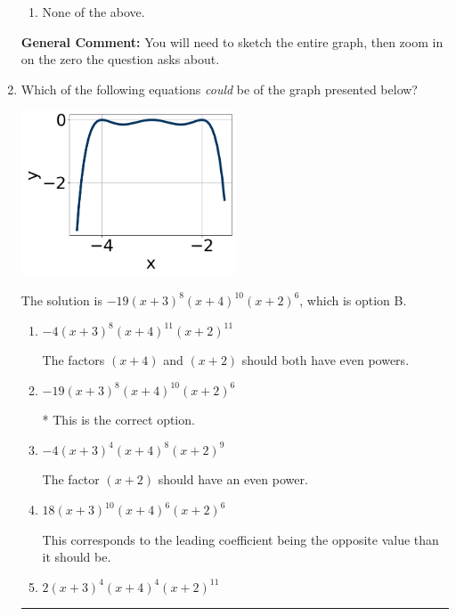 \documentclass{extbook}[14pt]
\newcommand{\litem}[1]{\item #1

\rule{\textwidth}{0.4pt}}
\begin{document}
\begin{enumerate}
{\begin{enumerate}[label=\Alph*.]
\item None of the above.\end{enumerate}
\textbf{General Comment:} You will need to sketch the entire graph, then zoom in on the zero the question asks about.
}
\litem{
Which of the following equations \textit{could} be of the graph presented below?

\begin{center}
    \includegraphics[width=0.5\textwidth]{../Figures/polyGraphToFunctionCopyC.png}
\end{center}


The solution is \( -19(x + 3)^{8} (x + 4)^{10} (x + 2)^{6} \), which is option B.\begin{enumerate}[label=\Alph*.]
\item \( -4(x + 3)^{8} (x + 4)^{11} (x + 2)^{11} \)

The factors $(x + 4)$ and $(x + 2)$ should both have even powers.
\item \( -19(x + 3)^{8} (x + 4)^{10} (x + 2)^{6} \)

* This is the correct option.
\item \( -4(x + 3)^{4} (x + 4)^{8} (x + 2)^{9} \)

The factor $(x + 2)$ should have an even power.
\item \( 18(x + 3)^{10} (x + 4)^{6} (x + 2)^{6} \)

This corresponds to the leading coefficient being the opposite value than it should be.
\item \( 2(x + 3)^{4} (x + 4)^{4} (x + 2)^{11} \)


\end{enumerate}}
\end{enumerate}
\end{document}
